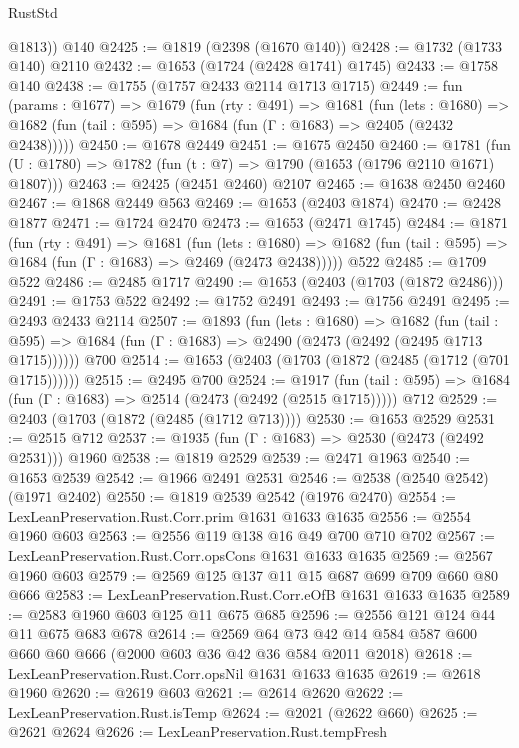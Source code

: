 \begin{lexlean}{RustStd}
\begin{coremodule}
{\begin{coremodule}
{{{{{{{{{{{{{{{{        @1813))
    @140
@2425 := @1819 (@2398 (@1670 @140))
@2428 := @1732 (@1733 @140) @2110
@2432 := @1653 (@1724 (@2428 @1741) @1745)
@2433 := @1758 @140
@2438 := @1755 (@1757 @2433 @2114 @1713 @1715)
@2449 := fun (params : @1677) =>
  @1679
    (fun (rty : @491) =>
    @1681
      (fun (lets : @1680) =>
      @1682 (fun (tail : @595) => @1684 (fun (Γ : @1683) => @2405 (@2432 @2438)))))
@2450 := @1678 @2449
@2451 := @1675 @2450
@2460 := @1781 (fun (U : @1780) => @1782 (fun (t : @7) => @1790 (@1653 (@1796 @2110 @1671) @1807)))
@2463 := @2425 (@2451 @2460) @2107
@2465 := @1638 @2450 @2460
@2467 := @1868 @2449 @563
@2469 := @1653 (@2403 @1874)
@2470 := @2428 @1877
@2471 := @1724 @2470
@2473 := @1653 (@2471 @1745)
@2484 := @1871
    (fun (rty : @491) =>
    @1681
      (fun (lets : @1680) =>
      @1682 (fun (tail : @595) => @1684 (fun (Γ : @1683) => @2469 (@2473 @2438)))))
    @522
@2485 := @1709 @522
@2486 := @2485 @1717
@2490 := @1653 (@2403 (@1703 (@1872 @2486)))
@2491 := @1753 @522
@2492 := @1752 @2491
@2493 := @1756 @2491
@2495 := @2493 @2433 @2114
@2507 := @1893
    (fun (lets : @1680) =>
    @1682
      (fun (tail : @595) => @1684 (fun (Γ : @1683) => @2490 (@2473 (@2492 (@2495 @1713 @1715))))))
    @700
@2514 := @1653 (@2403 (@1703 (@1872 (@2485 (@1712 (@701 @1715))))))
@2515 := @2495 @700
@2524 := @1917
    (fun (tail : @595) => @1684 (fun (Γ : @1683) => @2514 (@2473 (@2492 (@2515 @1715)))))
    @712
@2529 := @2403 (@1703 (@1872 (@2485 (@1712 @713))))
@2530 := @1653 @2529
@2531 := @2515 @712
@2537 := @1935 (fun (Γ : @1683) => @2530 (@2473 (@2492 @2531))) @1960
@2538 := @1819 @2529
@2539 := @2471 @1963
@2540 := @1653 @2539
@2542 := @1966 @2491 @2531
@2546 := @2538 (@2540 @2542) (@1971 @2402)
@2550 := @1819 @2539 @2542 (@1976 @2470)
@2554 := LexLeanPreservation.Rust.Corr.prim @1631 @1633 @1635
@2556 := @2554 @1960 @603
@2563 := @2556 @119 @138 @16 @49 @700 @710 @702
@2567 := LexLeanPreservation.Rust.Corr.opsCons @1631 @1633 @1635
@2569 := @2567 @1960 @603
@2579 := @2569 @125 @137 @11 @15 @687 @699 @709 @660 @80 @666
@2583 := LexLeanPreservation.Rust.Corr.eOfB @1631 @1633 @1635
@2589 := @2583 @1960 @603 @125 @11 @675 @685
@2596 := @2556 @121 @124 @44 @11 @675 @683 @678
@2614 := @2569
    @64
    @73
    @42
    @14
    @584
    @587
    @600
    @660
    @60
    @666
    (@2000 @603 @36 @42 @36 @584 @2011 @2018)
@2618 := LexLeanPreservation.Rust.Corr.opsNil @1631 @1633 @1635
@2619 := @2618 @1960
@2620 := @2619 @603
@2621 := @2614 @2620
@2622 := LexLeanPreservation.Rust.isTemp
@2624 := @2021 (@2622 @660)
@2625 := @2621 @2624
@2626 := LexLeanPreservation.Rust.tempFresh
}}}}}}}}}}}}}}}}
\end{coremodule}}
\end{coremodule}
\end{lexlean}
